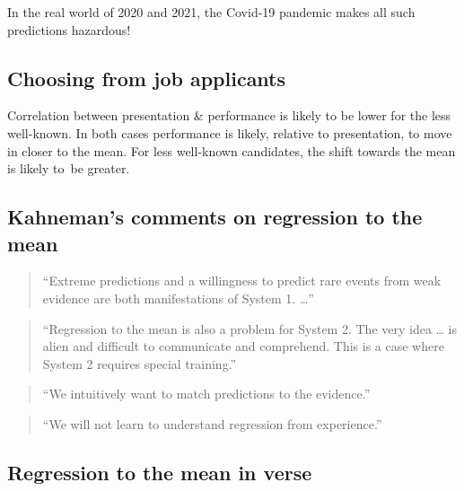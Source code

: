 \documentclass[
  10pt,
  b5paper]{book}
\begin{document}
In the real world of 2020 and 2021, the Covid-19 pandemic makes all such
predictions hazardous!

\hypertarget{choosing-from-job-applicants}{%
\subsection*{Choosing from job applicants}\label{choosing-from-job-applicants}}

Correlation between presentation \& performance is likely to
be lower for the less well-known. In both cases performance
is likely, relative to presentation, to move in closer to the
mean. For less well-known candidates, the shift towards the
mean is likely to~be greater.

\hypertarget{kahnemans-comments-on-regression-to-the-mean}{%
\subsection*{Kahneman's comments on regression to the mean}\label{kahnemans-comments-on-regression-to-the-mean}}

\begin{quote}
``Extreme predictions and a willingness to predict rare events from
weak evidence are both manifestations of System 1. \ldots{}''
\end{quote}

\begin{quote}
``Regression to the mean is also a problem for System 2. The very idea
\ldots{} is alien and difficult to communicate and comprehend. This is a
case where System 2 requires special training.''
\end{quote}

\begin{quote}
``We intuitively want to match predictions to the evidence.''
\end{quote}

\begin{quote}
``We will not learn to understand regression from experience.''
\end{quote}

\hypertarget{regression-to-the-mean-in-verse}{%
\subsection*{Regression to the mean in verse}\label{regression-to-the-mean-in-verse}}
\end{document}
